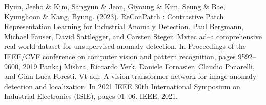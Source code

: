 \documentclass[journal,10pt,onecolumn,draftclsnofoot,]{IEEEtran}
\begin{document}
\begin{thebibliography}{00}
Hyun, Jeeho \& Kim, Sangyun \& Jeon, Giyoung \& Kim, Seung \& Bae, Kyunghoon \& Kang, Byung. (2023). ReConPatch : Contrastive Patch Representation Learning for Industrial Anomaly Detection.
Paul Bergmann, Michael Fauser, David Sattlegger, and
Carsten Steger. Mvtec ad–a comprehensive real-world
dataset for unsupervised anomaly detection. In Proceedings
of the IEEE/CVF conference on computer vision and pattern
recognition, pages 9592–9600, 2019
Pankaj Mishra, Riccardo Verk, Daniele Fornasier, Claudio
Piciarelli, and Gian Luca Foresti. Vt-adl: A vision transformer 
network for image anomaly detection and localization. In 2021 IEEE
 30th International Symposium on Industrial Electronics (ISIE), pages 01–06. IEEE, 2021.
\end{thebibliography} 
\end{document}
